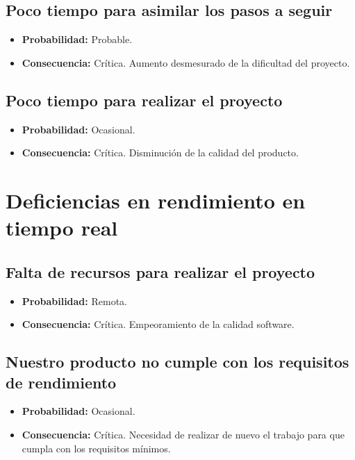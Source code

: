 \documentclass[spanish,a4paper,11pt, twoside]{report}	%
\begin{document}
	\subsection*{Poco tiempo para asimilar los pasos a seguir}	
		\begin{itemize}
			\item \textbf {Probabilidad: }Probable.
			\item \textbf {Consecuencia: }Crítica. Aumento desmesurado de la dificultad del proyecto.
		\end{itemize}
	
	\subsection*{Poco tiempo para realizar el proyecto}	
		\begin{itemize}
			\item \textbf {Probabilidad: }Ocasional.
			\item \textbf {Consecuencia: }Crítica. Disminución de la calidad del producto.
		\end{itemize}

%
\section{Deficiencias en rendimiento en tiempo real}

	\subsection*{Falta de recursos para realizar el proyecto}	
		\begin{itemize}
			\item \textbf {Probabilidad: }Remota.
			\item \textbf {Consecuencia: }Crítica. Empeoramiento de la calidad software.
		\end{itemize}
	
	\subsection*{Nuestro producto no cumple con los requisitos de rendimiento}	
		\begin{itemize}
			\item \textbf {Probabilidad: }Ocasional.
			\item \textbf {Consecuencia: }Crítica. Necesidad de realizar de nuevo el trabajo para que cumpla con los requisitos mínimos.
		\end{itemize}
	
\end{document}
